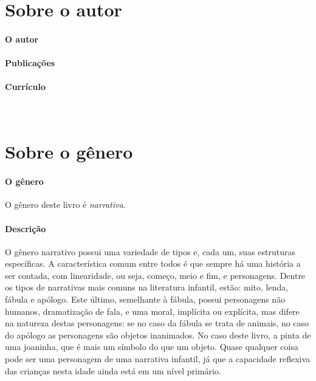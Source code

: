 \documentclass[11pt]{extarticle}
\begin{document}
\section{Sobre o autor}

\paragraph{O autor} 

\paragraph{Publicações} 

\paragraph{Currículo} 
 


\section{Sobre o gênero}

\paragraph{O gênero} O gênero deste livro é \textit{narrativa}. 

\paragraph{Descrição} 
O gênero narrativo possui uma variedade de tipos e, cada um, suas estruturas específicas.
A característica comum entre todos é que sempre há uma história a ser contada, com linearidade,
ou seja, começo, meio e fim, e personagens. 
Dentre os tipos de narrativas mais comuns na literatura infantil, estão: mito, lenda, 
fábula e apólogo. Este último, semelhante à fábula, possui personagens não humanos, 
dramatização de fala, e uma moral, implícita ou explícita, mas difere na natureza destas 
personagens: se no caso da fábula se trata de animais, no caso do apólogo as personagens 
são objetos inanimados. No caso deste livro, a pinta de uma joaninha, que é mais um 
símbolo do que um objeto. Quase qualquer coisa pode ser uma personagem de uma narrativa 
infantil, já que a capacidade reflexiva das crianças nesta idade ainda está em um nível primário. 


\end{document}
